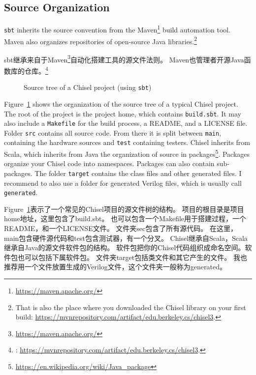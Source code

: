\documentclass[%
    10pt,
    headinclude, footexclude,
    openright, %
    notitlepage,
    cleardoubleempty,
    headsepline,
    pointlessnumbers,
    bibtotoc, idxtotoc,
    ]{scrbook}
\newcommand{\code}[1]{{\small{\texttt{#1}}}}
\newcommand{\myref}[2]{\href{#1}{#2}}
\renewcommand{\myref}[2]{{#2}{\footnote{\url{#1}}}}
\begin{document}
\subsection{Source Organization}

\code{sbt} inherits the source convention from the \myref{https://maven.apache.org/}{Maven}
build automation tool. Maven also organizes repositories of open-source Java libraries.\footnote{That is
also the place where you downloaded the Chisel library on your first build:
\url{https://mvnrepository.com/artifact/edu.berkeley.cs/chisel3}.}

sbt继承来自于\myref{https://maven.apache.org/}{Maven}自动化搭建工具的源文件法则。
Maven也管理者开源Java函数库的仓库。\footnote{:
\url{https://mvnrepository.com/artifact/edu.berkeley.cs/chisel3}.}

\begin{figure}
\caption{Source tree of a Chisel project (using \code{sbt})}
\label{fig:folders}
\end{figure}

Figure~\ref{fig:folders} shows the organization of the source tree of a typical Chisel project.
The root of the project is the project home, which contains \code{build.sbt}.
It may also include a \code{Makefile} for the build process, a README, and a LICENSE file.
Folder \code{src} contains all source code. From there it is split between \code{main},
containing the hardware sources and \code{test} containing testers.
Chisel inherits from Scala, which inherits from Java the organization of source
in \myref{https://en.wikipedia.org/wiki/Java_package}{packages}.
Packages organize your Chisel code into namespaces. Packages can also contain
sub-packages.
The folder \code{target} contains the class files and other generated files.
I recommend to also use a folder for generated Verilog files, which is usually
call \code{generated}.

Figure~\ref{fig:folders}表示了一个常见的Chisel项目的源文件树的结构。
项目的根目录是项目home地址，这里包含了build.sbt。
也可以包含一个Makefile用于搭建过程，一个README，和一个LICENSE文件。
文件夹sec包含了所有源代码。
在这里，main包含硬件源代码和test包含测试器，有一个分叉。
Chisel继承自Scala，Scala继承自Java的源文件软件包的结构。
软件包把你的Chisel代码组织成命名空间。软件包也可以包括下属软件包。
文件夹target包括类文件和其它产生的文件。
我也推荐用一个文件放置生成的Verilog文件，这个文件夹一般称为generated。
\end{document}
